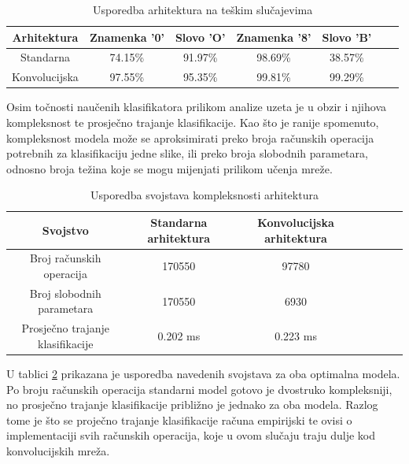 \documentclass[lmodern, utf8, diplomski, numeric]{fer}
\begin{document}
\hspace{2em}
\begin{table}[ht!]
\begin{center}
\centering
    \begin{tabular}{ | c| c| c|c | c| c| c|}
    \hline    		
    Arhitektura & Znamenka '0' & Slovo 'O' & Znamenka '8' & Slovo 'B'  \\ \hline
    Standarna & 74.15\% & 91.97\% & 98.69\% & 38.57\%  \\ \hline
    Konvolucijska & 97.55\% & 95.35\% & 99.81\% & 99.29\%   \\
    \hline
    \end{tabular}
\end{center}
\caption{Usporedba arhitektura na teškim slučajevima}
\label{tab:hardexample}
\end{table}

Osim točnosti naučenih klasifikatora prilikom analize uzeta je u obzir i njihova kompleksnost te prosječno trajanje klasifikacije. Kao što je ranije spomenuto, kompleksnost modela može se aproksimirati preko broja računskih operacija potrebnih za klasifikaciju jedne slike, ili preko broja slobodnih parametara, odnosno broja težina koje se mogu mijenjati prilikom učenja mreže.  

\hspace{2em}
\begin{table}[ht!]
\begin{center}
\centering
    \begin{tabular}{ | c| c| c|c | c| c| c|}
    \hline    		
    Svojstvo & Standarna arhitektura & Konvolucijska arhitektura \\ \hline
    Broj računskih operacija & 170550 & 97780  \\ \hline
    Broj slobodnih parametara & 170550 & 6930   \\ \hline
    Prosječno trajanje klasifikacije  & 0.202 ms & 0.223 ms \\
    \hline
    \end{tabular}
\end{center}
\caption{Usporedba svojstava kompleksnosti arhitektura}
\label{tab:complexity}
\end{table}

U tablici \ref{tab:complexity} prikazana je usporedba navedenih svojstava za oba optimalna modela. Po broju računskih operacija standarni model gotovo je dvostruko kompleksniji, no prosječno trajanje klasifikacije približno je jednako za oba modela. Razlog tome je što se proječno trajanje klasifikacije računa empirijski te ovisi o implementaciji svih računskih operacija, koje u ovom slučaju traju dulje kod konvolucijskih mreža. 
\end{document}
